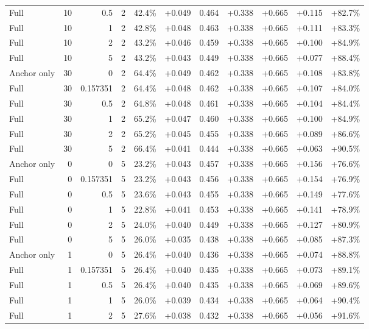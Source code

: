 \begin{table}[htbp]
\begin{tabular}{lrrrccccccc}
Full & 10 & 0.5 & 2 & 42.4\% & +0.049 & 0.464 & +0.338 & +0.665 & +0.115 & +82.7\% \\
Full & 10 & 1 & 2 & 42.8\% & +0.048 & 0.463 & +0.338 & +0.665 & +0.111 & +83.3\% \\
Full & 10 & 2 & 2 & 43.2\% & +0.046 & 0.459 & +0.338 & +0.665 & +0.100 & +84.9\% \\
Full & 10 & 5 & 2 & 43.2\% & +0.043 & 0.449 & +0.338 & +0.665 & +0.077 & +88.4\% \\
Anchor only & 30 & 0 & 2 & 64.4\% & +0.049 & 0.462 & +0.338 & +0.665 & +0.108 & +83.8\% \\
Full & 30 & 0.157351 & 2 & 64.4\% & +0.048 & 0.462 & +0.338 & +0.665 & +0.107 & +84.0\% \\
Full & 30 & 0.5 & 2 & 64.8\% & +0.048 & 0.461 & +0.338 & +0.665 & +0.104 & +84.4\% \\
Full & 30 & 1 & 2 & 65.2\% & +0.047 & 0.460 & +0.338 & +0.665 & +0.100 & +84.9\% \\
Full & 30 & 2 & 2 & 65.2\% & +0.045 & 0.455 & +0.338 & +0.665 & +0.089 & +86.6\% \\
Full & 30 & 5 & 2 & 66.4\% & +0.041 & 0.444 & +0.338 & +0.665 & +0.063 & +90.5\% \\
Anchor only & 0 & 0 & 5 & 23.2\% & +0.043 & 0.457 & +0.338 & +0.665 & +0.156 & +76.6\% \\
Full & 0 & 0.157351 & 5 & 23.2\% & +0.043 & 0.456 & +0.338 & +0.665 & +0.154 & +76.9\% \\
Full & 0 & 0.5 & 5 & 23.6\% & +0.043 & 0.455 & +0.338 & +0.665 & +0.149 & +77.6\% \\
Full & 0 & 1 & 5 & 22.8\% & +0.041 & 0.453 & +0.338 & +0.665 & +0.141 & +78.9\% \\
Full & 0 & 2 & 5 & 24.0\% & +0.040 & 0.449 & +0.338 & +0.665 & +0.127 & +80.9\% \\
Full & 0 & 5 & 5 & 26.0\% & +0.035 & 0.438 & +0.338 & +0.665 & +0.085 & +87.3\% \\
Anchor only & 1 & 0 & 5 & 26.4\% & +0.040 & 0.436 & +0.338 & +0.665 & +0.074 & +88.8\% \\
Full & 1 & 0.157351 & 5 & 26.4\% & +0.040 & 0.435 & +0.338 & +0.665 & +0.073 & +89.1\% \\
Full & 1 & 0.5 & 5 & 26.4\% & +0.040 & 0.435 & +0.338 & +0.665 & +0.069 & +89.6\% \\
Full & 1 & 1 & 5 & 26.0\% & +0.039 & 0.434 & +0.338 & +0.665 & +0.064 & +90.4\% \\
Full & 1 & 2 & 5 & 27.6\% & +0.038 & 0.432 & +0.338 & +0.665 & +0.056 & +91.6\% \\

\end{tabular}
\end{table}
